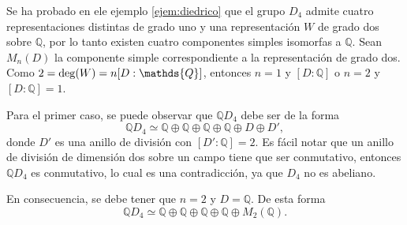  \begin{ejemplo}
 Se ha probado en ele ejemplo \ref{ejem:diedrico} que el grupo $D_4$ admite cuatro representaciones distintas de grado uno y una representación $W$ de grado dos sobre $\mathds{Q}$, por lo tanto existen cuatro componentes simples isomorfas a $\mathds{Q}$. Sean $M_n(D)$ la componente simple correspondiente a la representación de grado dos. Como $2 = \grado(W) = n[D:\mathds{Q}]$, entonces $n = 1$ y $[D:\mathds{Q}]$ o $n = 2$ y $[D:\mathds{Q}] = 1$.
 
 Para el primer caso, se puede observar que $\mathds{Q}D_4$ debe ser de la forma \begin{equation*} \mathds{Q}D_4 \simeq \mathds{Q} \oplus \mathds{Q} \oplus \mathds{Q}\oplus\mathds{Q}\oplus D\oplus D',\end{equation*} donde $D'$ es una anillo de división con $[D':\mathds{Q}] = 2$. Es fácil notar que un anillo de división de dimensión dos sobre un campo tiene que ser conmutativo, entonces $\mathds{Q}D_4$ es conmutativo, lo cual es una contradicción, ya que $D_4$ no es abeliano. 
 
 En consecuencia, se debe tener que $n = 2$ y $D = \mathds{Q}$. De esta forma \begin{equation*}  \mathds{Q}D_4 \simeq \mathds{Q}\oplus\mathds{Q}\oplus\mathds{Q}\oplus\mathds{Q}\oplus M_{2}(\mathds{Q}). \end{equation*}
 \end{ejemplo}
 

